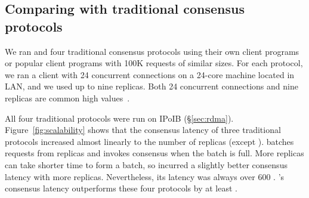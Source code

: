 \subsection{Comparing with traditional consensus protocols}
\label{sec:eval-traditional}

We ran \xxx and four traditional consensus protocols using their own 
client programs or popular client programs with 100K requests of similar sizes. 
For each protocol, we ran a client with 24 concurrent connections on a 24-core 
machine located in LAN, and we used up to nine replicas. Both 24 concurrent 
connections and nine replicas are common high 
values~\cite{zookeeper,crane:sosp15,rex:eurosys14,dare:hpdc15}.


All four traditional protocols were run on IPoIB (\S\ref{sec:rdma}). 
Figure~\ref{fig:scalability} shows that the consensus latency of three 
traditional protocols increased almost linearly to the number of replicas 
(except \spaxos). \spaxos batches requests from replicas and invokes consensus 
when the batch is full. More replicas can take shorter time to form a batch, so 
\spaxos incurred a slightly better consensus latency with more replicas. 
Nevertheless, its latency was always over 600 \us. \xxx's consensus latency 
outperforms these four protocols by at least \comptradlow.

